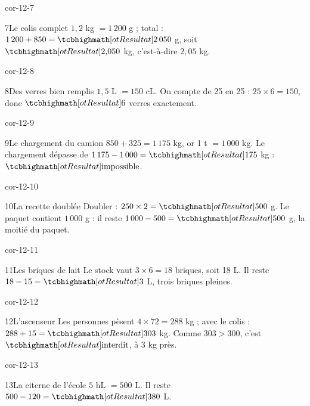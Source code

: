 \begin{blocLivre}{cor-12-7}\begin{corrige}{7}{Le colis complet}
$1{,}2$ kg $=1\,200$ g ; total : $1\,200+850=\res{2\,050}$ g, soit $\res{2{,}050}$ kg, c’est-à-dire $2{,}05$ kg.
\end{corrige}\end{blocLivre}
\begin{blocLivre}{cor-12-8}\begin{corrige}{8}{Des verres bien remplis}
$1{,}5$ L $=150$ cL. On compte de 25 en 25 : $25\times6=150$, donc $\res6$ verres exactement.
\end{corrige}\end{blocLivre}
\begin{blocLivre}{cor-12-9}\begin{corrige}{9}{Le chargement du camion}
$850+325=1\,175$ kg, or 1 t $=1\,000$ kg. Le chargement dépasse de $1\,175-1\,000=\res{175}$ kg : $\res{\text{impossible}}$.
\end{corrige}\end{blocLivre}
\begin{blocLivre}{cor-12-10}\begin{corrige}{10}{La recette doublée}
Doubler : $250\times2=\res{500}$ g. Le paquet contient $1\,000$ g : il reste $1\,000-500=\res{500}$ g, la moitié du paquet.
\end{corrige}\end{blocLivre}
\begin{blocLivre}{cor-12-11}\begin{corrige}{11}{Les briques de lait}
Le stock vaut $3\times6=18$ briques, soit 18 L. Il reste $18-15=\res3$ L, trois briques pleines.
\end{corrige}\end{blocLivre}
\begin{blocLivre}{cor-12-12}\begin{corrige}{12}{L’ascenseur}
Les personnes pèsent $4\times72=288$ kg ; avec le colis : $288+15=\res{303}$ kg. Comme $303>300$, c’est $\res{\text{interdit}}$, à 3 kg près.
\end{corrige}\end{blocLivre}
\begin{blocLivre}{cor-12-13}\begin{corrige}{13}{La citerne de l’école}
$5$ hL $=500$ L. Il reste $500-120=\res{380}$ L.
\end{corrige}\end{blocLivre}
